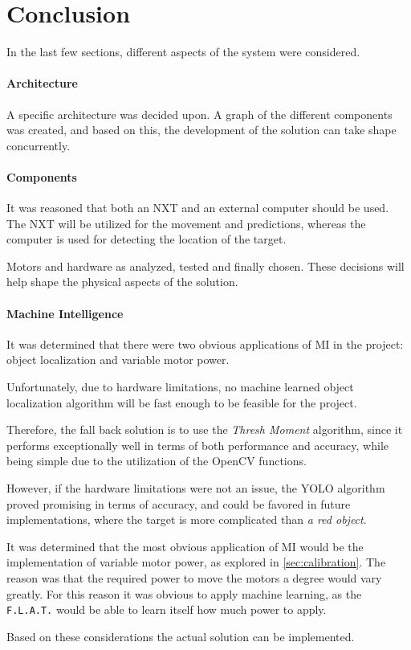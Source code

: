 \section{Conclusion}
In the last few sections, different aspects of the system were considered.

\paragraph{Architecture}
A specific architecture was decided upon.
A graph of the different components was created, and based on this, the development of the solution can take shape concurrently.


\paragraph{Components}
It was reasoned that both an NXT and an external computer should be used.
The NXT will be utilized for the movement and predictions, whereas the computer is used for detecting the location of the target.


Motors and hardware as analyzed, tested and finally chosen.
These decisions will help shape the physical aspects of the solution.


\paragraph{Machine Intelligence}
It was determined that there were two obvious applications of MI in the project: object localization and variable motor power.

Unfortunately, due to hardware limitations, no machine learned object localization algorithm will be fast enough to be feasible for the project.

Therefore, the fall back solution is to use the \textit{Thresh Moment} algorithm, since it performs exceptionally well in terms of both performance and accuracy, while being simple due to the utilization of the OpenCV functions.

However, if the hardware limitations were not an issue, the YOLO algorithm proved promising in terms of accuracy, and could be favored in future implementations, where the target is more complicated than \textit{a red object}.

It was determined that the most obvious application of MI would be the implementation of variable motor power, as explored in \autoref{sec:calibration}.
The reason was that the required power to move the motors a degree would vary greatly.
For this reason it was obvious to apply machine learning, as the \texttt{F.L.A.T.} would be able to learn itself how much power to apply.

Based on these considerations the actual solution can be implemented.
